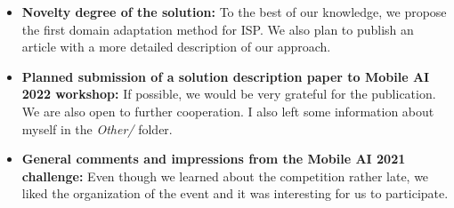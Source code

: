 \documentclass{article}
\begin{document}
\begin{itemize}
\item \textbf{Novelty degree of the solution:} To the best of our knowledge, we propose the first domain adaptation method for ISP. We also plan to publish an article with a more detailed description of our approach.
\item \textbf{Planned submission of a solution description paper to Mobile AI 2022 workshop:} If possible, we would be very grateful for the publication. We are also open to further cooperation. I also left some information about myself in the \textit{Other/} folder.
\item \textbf{General comments and impressions from the Mobile AI 2021 challenge:} Even though we learned about the competition rather late, we liked the organization of the event and it was interesting for us to participate.
\end{itemize}

\bigskip

\printbibliography
\end{document}
